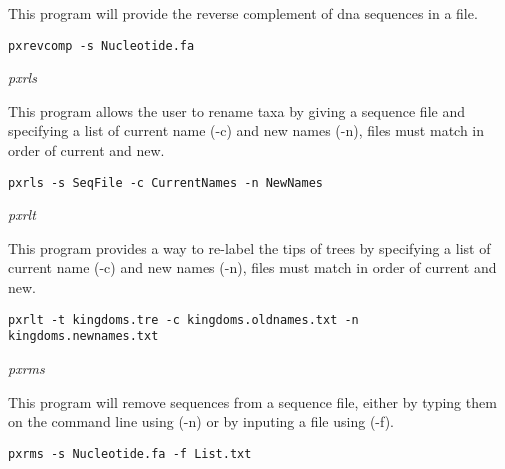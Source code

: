 \documentclass[12pt,letterpaper]{article}
\renewcommand{\subsection}[1]{%
\bigskip
\begin{center}
\begin{large}
\normalfont\itshape #1
\end{large}
\end{center}}
\begin{document}
This program will provide the reverse complement of dna sequences in a file.

\begin{flushleft}
\begin{verbatim}
pxrevcomp -s Nucleotide.fa
\end{verbatim}
\end{flushleft}

\subsection{pxrls}

This program allows the user to rename taxa by giving a sequence file and specifying a list of current name (-c) and new names (-n), files must match in order of current and new.

\begin{flushleft}
\begin{verbatim}
pxrls -s SeqFile -c CurrentNames -n NewNames
\end{verbatim}
\end{flushleft}


\subsection{pxrlt}

This program provides a way to re-label the tips of trees by specifying a list of current name (-c) and new names (-n), files must match in order of current and new.

\begin{flushleft}
\begin{verbatim}
pxrlt -t kingdoms.tre -c kingdoms.oldnames.txt -n kingdoms.newnames.txt
\end{verbatim}
\end{flushleft}

\subsection{pxrms}

This program will remove sequences from a sequence file, either by typing them on the command line using (-n) or by inputing a file using (-f).

\begin{flushleft}
\begin{verbatim}
pxrms -s Nucleotide.fa -f List.txt
\end{verbatim}
\end{flushleft}
\end{document}
